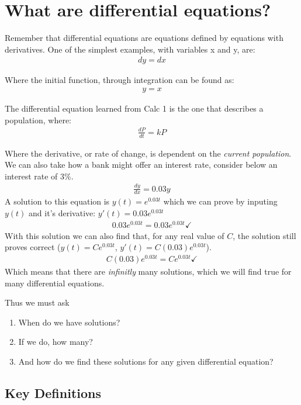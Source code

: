 \section{What are differential equations?}

Remember that differential equations are equations defined by equations with derivatives. One of the simplest examples, with variables x and y, are:
\begin{align*}
    dy=dx
\end{align*}

Where the initial function, through integration can be found as:
\begin{align*}
    y=x
\end{align*}

The differential equation learned from Calc 1 is the one that describes a population, where:
\begin{align*}
    \frac{dP}{dt}=kP
\end{align*}

Where the derivative, or rate of change, is dependent on the \emph{current population}. We can also take how a bank might offer an interest rate, consider below an interest rate of $3\%$.
\begin{align*}
    \frac{dy}{dx}=0.03y
\end{align*}
A solution to this equation is $y(t)=e^{0.03t}$ which we can prove by inputing $y(t)$ and it's derivative: $y'(t)=0.03e^{0.03t}$
\begin{align*}
    0.03e^{0.03t} = 0.03e^{0.03t} \checkmark
\end{align*}
With this solution we can also find that, for any real value of $C$, the solution still proves correct ($y(t)=Ce^{0.03t}$, $y'(t)=C(0.03)e^{0.03t}$).
\begin{align*}
    C(0.03)e^{0.03t}=Ce^{0.03t} \checkmark
\end{align*}
Which means that there are \emph{infinitly} many solutions, which we will find true for many differential equations.

Thus we must ask
\begin{enumerate}
    \item When do we have solutions?
    \item If we do, how many?
    \item And how do we find these solutions for any given differential equation?
\end{enumerate}

\subsection{Key Definitions}

